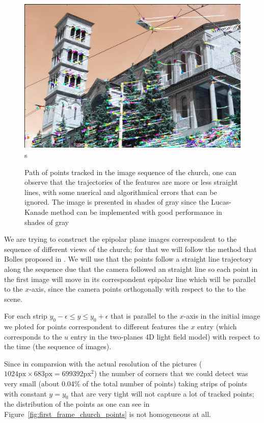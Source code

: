\begin{figure}[h!]
\centering
\includegraphics[width=1\textwidth]{./Diagrams/track_points_church.png}s
\caption{Path of points tracked in the image sequence of the church, one can observe that the trajectories of the features are more or less straight lines, with some nuerical and algorithmical errors that can be ignored. The image is presented in shades of gray since the Lucas-Kanade method can be implemented with good performance in shades of gray}
\label{fig:track_points_church}
\end{figure}

\bigskip

We are trying to construct the epipolar plane images correspondent to the sequence of different views of the church; for that we will follow the method that Bolles proposed in \cite{Bolles}. We will use that the points follow a straight line trajectory along the sequence due that the camera followed an straight line so each point in the first image will move in its correspondent epipolar line which will be parallel to the $x$-axis, since the camera points orthogonally with respect to the to the scene. 

\bigskip

For each strip $y_0-\epsilon \leq y \leq y_0+\epsilon$ that is parallel to the $x$-axis in the initial image we ploted for points correspondent to different features the $x$ entry (which corresponds to the $u$ entry in the two-planes 4D light field model) with respect to the time (the sequence of images).

\bigskip

Since in comparsion with the actual resolution of the pictures ($1024\text{px}\times 683\text{px}=699392\text{px}^2$) the number of corners that we could detect was very small (about 0.04\% of the total number of points) taking strips of points with constant $y=y_0$ that are very tight will not capture a lot of tracked points; the distribution of the points as one can see in Figure~\ref{fig:first_frame_church_points} is not homogeneous at all. 

